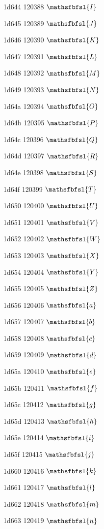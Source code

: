 \documentclass[11pt]{article}
\begin{document}
1d644 120388 \ensuremath{\mathsfbfsl{I}}

1d645 120389 \ensuremath{\mathsfbfsl{J}}

1d646 120390 \ensuremath{\mathsfbfsl{K}}

1d647 120391 \ensuremath{\mathsfbfsl{L}}

1d648 120392 \ensuremath{\mathsfbfsl{M}}

1d649 120393 \ensuremath{\mathsfbfsl{N}}

1d64a 120394 \ensuremath{\mathsfbfsl{O}}

1d64b 120395 \ensuremath{\mathsfbfsl{P}}

1d64c 120396 \ensuremath{\mathsfbfsl{Q}}

1d64d 120397 \ensuremath{\mathsfbfsl{R}}

1d64e 120398 \ensuremath{\mathsfbfsl{S}}

1d64f 120399 \ensuremath{\mathsfbfsl{T}}

1d650 120400 \ensuremath{\mathsfbfsl{U}}

1d651 120401 \ensuremath{\mathsfbfsl{V}}

1d652 120402 \ensuremath{\mathsfbfsl{W}}

1d653 120403 \ensuremath{\mathsfbfsl{X}}

1d654 120404 \ensuremath{\mathsfbfsl{Y}}

1d655 120405 \ensuremath{\mathsfbfsl{Z}}

1d656 120406 \ensuremath{\mathsfbfsl{a}}

1d657 120407 \ensuremath{\mathsfbfsl{b}}

1d658 120408 \ensuremath{\mathsfbfsl{c}}

1d659 120409 \ensuremath{\mathsfbfsl{d}}

1d65a 120410 \ensuremath{\mathsfbfsl{e}}

1d65b 120411 \ensuremath{\mathsfbfsl{f}}

1d65c 120412 \ensuremath{\mathsfbfsl{g}}

1d65d 120413 \ensuremath{\mathsfbfsl{h}}

1d65e 120414 \ensuremath{\mathsfbfsl{i}}

1d65f 120415 \ensuremath{\mathsfbfsl{j}}

1d660 120416 \ensuremath{\mathsfbfsl{k}}

1d661 120417 \ensuremath{\mathsfbfsl{l}}

1d662 120418 \ensuremath{\mathsfbfsl{m}}

1d663 120419 \ensuremath{\mathsfbfsl{n}}
\end{document}

